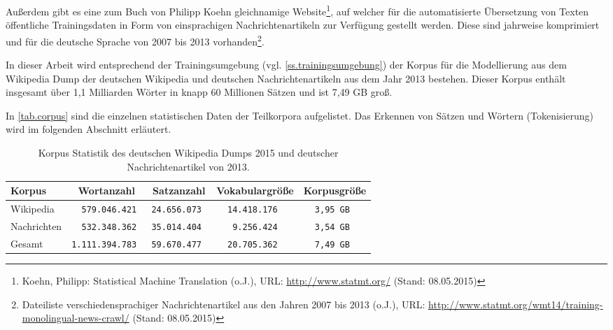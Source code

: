 Außerdem gibt es eine zum Buch  von Philipp Koehn gleichnamige Website\footnote{Koehn, Philipp: Statistical Machine Translation (o.J.), URL: \url{http://www.statmt.org/} (Stand: 08.05.2015)}, auf welcher für die automatisierte Übersetzung von Texten öffentliche Trainingsdaten in Form von einsprachigen Nachrichtenartikeln zur Verfügung gestellt werden. Diese sind jahrweise komprimiert und für die deutsche Sprache von 2007 bis 2013 vorhanden\footnote{Dateiliste verschiedensprachiger Nachrichtenartikel aus den Jahren 2007 bis 2013 (o.J.), URL: \url{http://www.statmt.org/wmt14/training-monolingual-news-crawl/} (Stand: 08.05.2015)}.


In dieser Arbeit wird entsprechend der Trainingsumgebung (vgl. \autoref{ss.trainingsumgebung}) der Korpus für die Modellierung aus dem Wikipedia Dump der deutschen Wikipedia und deutschen Nachrichtenartikeln aus dem Jahr 2013 bestehen. Dieser Korpus enthält insgesamt über 1,1 Milliarden Wörter in knapp 60 Millionen Sätzen und ist 7,49 GB groß. %

In \autoref{tab.corpus} sind die einzelnen statistischen Daten der Teilkorpora aufgelistet. Das Erkennen von Sätzen und Wörtern (Tokenisierung) wird im folgenden Abschnitt erläutert.

\begin{table}[!ht]\vspace{1ex}\small\centering{}\begin{tabular}{|l|c|c|c|c|}
\hline Korpus & Wortanzahl & Satzanzahl & Vokabulargröße & Korpusgröße \\ \hline\hline
Wikipedia & \tt{ \ 579.046.421} & \tt{24.656.073} & \tt{14.418.176} & \tt{3,95 GB} \\ \hline
Nachrichten & \tt{ \ 532.348.362} & \tt{35.014.404} & \tt{\ 9.256.424} & \tt{3,54 GB} \\ \hline\hline
Gesamt & \tt{1.111.394.783} & \tt{59.670.477} & \tt{20.705.362} & \tt{7,49 GB} \\ \hline
\end{tabular}
\caption[Korpus Statistik]{\label{tab.corpus}Korpus Statistik des deutschen Wikipedia Dumps 2015 und deutscher Nachrichtenartikel von 2013.}
\vspace{1ex}\end{table}


